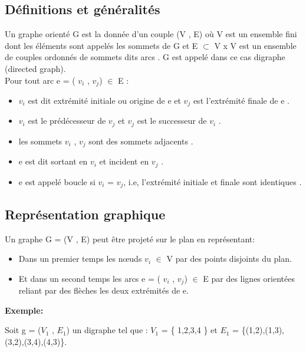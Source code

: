 
		\subsection{Définitions et généralités}
		Un graphe orienté G est la donnée d'un couple (V , E) où
		V est un ensemble fini dont les éléments sont appelés les sommets de G et 
		E  $\subset$ V x V est un ensemble de couples ordonnés de sommets dits arcs  \citep{muller}. G est appelé dans ce cas digraphe (directed graph).\\
		 Pour tout arc e = ( $v_{i}$ , $v_{j}$) $\in$ E :
		 \begin{itemize}  
			\item $v_{i}$ est dit extrémité initiale ou origine de e et $v_{j}$ est l'extrémité finale de e \citep{muller}.
			
			\item $v_{i}$ est le prédécesseur de $v_{j}$ et $v_{j}$ est le successeur de $v_{i}$ \citep{IUTLyonInformatique}.
			
			\item les sommets $v_{i}$ , $v_{j}$ sont des sommets adjacents \citep{Pres}.
			
			\item e est dit sortant en $v_{i}$ et incident en $v_{j}$ \citep{Pres}.
			
			\item e est appelé boucle si $v_{i}$ = $v_{j}$, i.e, l'extrémité initiale et finale sont identiques \citep{IUTLyonInformatique}.
			
		\end{itemize}
		 
		
		\subsection{Représentation graphique}
		
		
		Un graphe G = (V , E) peut être projeté sur le plan en représentant:
		\begin{itemize} 
		\item Dans un premier temps les nœuds $v_{i}$ $\in$ V par des points disjoints du plan.
		\item Et dans un second temps les arcs e = ( $v_{i}$ , $v_{j}$) $\in$ E par des lignes orientées reliant par des flèches les deux extrémités de e. 
		\end{itemize}
		
		\textbf{Exemple:}
		
		Soit g = ($V_{1}$ , $E_{1}$) un digraphe tel que : $V_{1}$ = \{ 1,2,3,4 \} et  $E_{1}$ = \{(1,2),(1,3),(3,2),(3,4),(4,3)\}.
		
